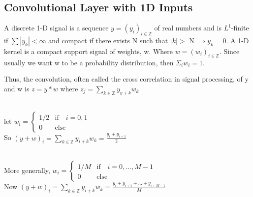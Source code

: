 \subsection{Convolutional Layer with 1D Inputs}
\begin{definition}
    A discrete 1-D signal is a sequence $y=(y_i)_{i\in\mathbb{Z}}$ of real numbers and is $L^1$-finite if $\sum|y_k| < \infty$ and compact if there exists N such that $|k| >$ N $\Rightarrow y_k=0$.
    A 1-D kernel is a compact support signal of weights, w. Where $w = (w_i)_{i\in\mathbb{Z}}$. Since usually we want w to be a probability distribution, then $\Sigma_{i}w_i = 1$.
\end{definition}
Thus, the convolution, often called the cross correlation in signal processing, of y and w is $z=y*w$ where $z_{j} = \sum_{k\in\mathbb{Z}} y_{y+k}w_{k}$
\begin{example} \quad
\\
let
$w_i = \begin{cases}
    1/2 &\text{if} \quad i=0,1\\
    0 &\text{else}
\end{cases}$
\\
So $(y+w)_i=\sum_{k\in\mathbb{Z}} y_{i+k}w_k=\frac{y_i+y_{i+1}}{2}$
\end{example}
\noindent
\\
More generally,
$w_i = \begin{cases}
    1/M &\text{if} \quad i=0,...,M-1\\
    0 &\text{else}
\end{cases}$
\\
Now $(y+w)_i=\sum_{k\in\mathbb{Z}} y_{i+k}w_k=\frac{y_i+y_{i+1}+...+y_{i+M-1}}{M}$
\\
